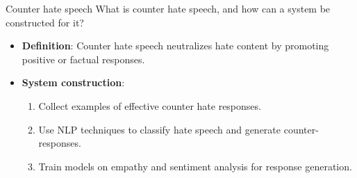\documentclass{article}
\begin{document}
\begin{exercise}{Counter hate speech}
  What is counter hate speech, and how can a system be constructed for it?

  \begin{solution}
    \begin{itemize}
        \item \textbf{Definition}: Counter hate speech neutralizes hate content by promoting positive or factual responses.
        \item \textbf{System construction}:
        \begin{enumerate}
            \item Collect examples of effective counter hate responses.
            \item Use NLP techniques to classify hate speech and generate counter-responses.
            \item Train models on empathy and sentiment analysis for response generation.
        \end{enumerate}
    \end{itemize}
  \end{solution}
\end{exercise}
\end{document}
